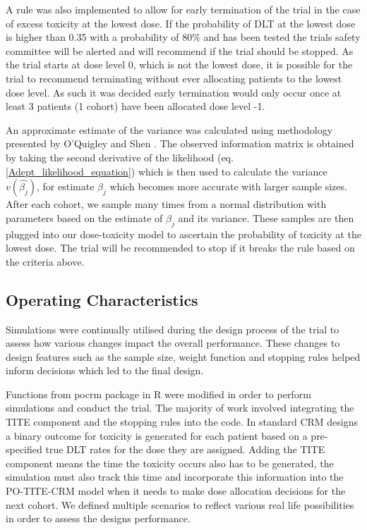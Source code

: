 A rule was also implemented to allow for early termination of the trial in the case of excess toxicity at the lowest dose. If the probability of DLT at the lowest dose is higher than 0.35 with a probability of 80\% and has been tested the trials safety committee will be alerted and will recommend if the trial should be stopped. As the trial starts at dose level 0, which is not the lowest dose, it is possible for the trial to recommend terminating without ever allocating patients to the lowest dose level. As such it was decided early termination would only occur once at least 3 patients (1 cohort) have been allocated dose level -1. 

An approximate estimate of the variance was calculated using methodology presented by O'Quigley and Shen \cite{oquigleyContinualReassessmentMethod1996}. The observed information matrix is obtained by taking the second derivative of the likelihood (eq. \ref{Adept_likelihood_equation}) which is then used to calculate the variance $v(\hat{\beta_j})$, for estimate $\beta_j$ which becomes more accurate with larger sample sizes. After each cohort, we sample many times from a normal distribution with parameters based on the estimate of $\beta_j$ and its variance. These samples are then plugged into our dose-toxicity model to ascertain the probability of toxicity at the lowest dose. The trial will be recommended to stop if it breaks the rule based on the criteria above. 


\subsection{Operating Characteristics}
\label{section2.3.4}%

Simulations were continually utilised during the design process of the trial to assess how various changes impact the overall performance. These changes to design features such as the sample size, weight function and stopping rules helped inform decisions which led to the final design.  

Functions from pocrm package in R \cite{wagesPocrmRpackagePhase2013, wagesPocrmDoseFinding2019} were modified in order to perform simulations and conduct the trial. The majority of work involved integrating the TITE component and the stopping rules into the code. In standard CRM designs a binary outcome for toxicity is generated for each patient based on a pre-specified true DLT rates for the dose they are assigned. Adding the TITE component means the time the toxicity occurs also has to be generated, the simulation must also track this time and incorporate this information into the PO-TITE-CRM model when it needs to make dose allocation decisions for the next cohort. We defined multiple scenarios to reflect various real life possibilities in order to assess the designs performance.  

